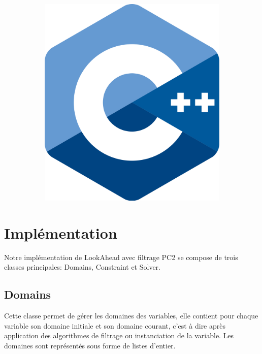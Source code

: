 \documentclass[12pt]{report}
\begin{document}
\begin{figure}[H]
\begin{subfigure}{.5\textwidth}
		\includegraphics[scale=0.08]{imgs/C++.png}
		\label{fig:sub2}
	\end{subfigure}
	\label{fig:test}
\end{figure}
\section{Implémentation}
Notre implémentation de LookAhead avec filtrage PC2 se compose de trois classes principales: Domains, Constraint et Solver.
\subsection{Domains}
Cette classe permet de gérer les domaines des variables, elle contient pour chaque variable son domaine initiale et son domaine courant, c’est à dire après application des algorithmes de filtrage ou instanciation de la variable. Les domaines sont représentés sous forme de listes d'entier.
\end{document}

